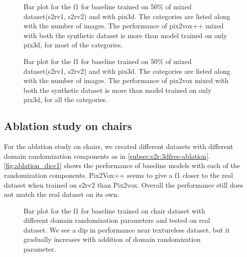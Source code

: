 \begin{figure}
    \centering
    \resizebox{0.7\textwidth}{!}{}
    \caption{Bar plot for the \gls{f1} for baseline  trained on 50\% of mixed dataset(\gls{s2rv1}, \gls{s2rv2}) and with pix3d.
    The categories are listed along with the number of images.
    The performance of pix2vox++ mixed with both the synthetic dataset is more than model trained on only pix3d, for most of the categories.
    }
    \label{fig:mixed_dice2}
\end{figure}

\begin{figure}
    \centering
    \resizebox{0.7\textwidth}{!}{}
    \caption{Bar plot for the \gls{f1} for baseline  trained on 50\% of mixed dataset(\gls{s2rv1}, \gls{s2rv2}) and with pix3d.
    The categories are listed along with the number of images.
    The performance of pix2vox mixed with both the synthetic dataset is more than model trained on only pix3d, for all the categories.}
    \label{fig:mixed_dice3}
\end{figure}

\subsection{Ablation study on chairs}\label{subsec:ablation-study-on-chairs}

For the ablation study on chairs, we created different datasets with different domain randomization components as in \autoref{subsec:s2r:3dfree-ablation}.
\autoref{fig:ablation_dice1} shows the performance of baseline models with each of the randomization components.
Pix2Vox++ seems to give a \gls{f1} closer to the real dataset when trained on \gls{s2rv2} than Pix2vox.
Overall the performance still does not match the real dataset on its own.

\begin{figure}[ht]
    \centering
    \resizebox{0.7\textwidth}{!}{}
    \caption{Bar plot for the \gls{f1}  for baseline trained on chair dataset with different domain randomization parameters and tested on real dataset.
    We see a dip in performance near textureless dataset, but it gradually increases with addition of domain randomization parameter.}
    \label{fig:ablation_dice1}
\end{figure}

